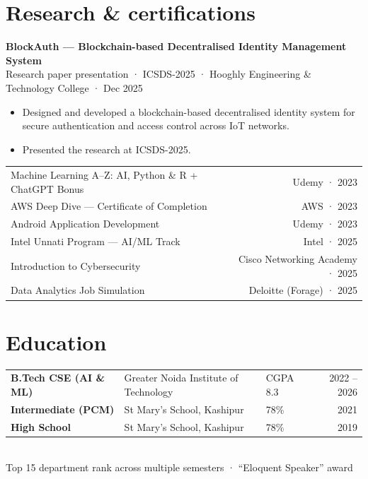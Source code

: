 \documentclass[10pt,a4paper]{article}
\begin{document}
\section{Research \& certifications}
\textbf{BlockAuth --- Blockchain-based Decentralised Identity Management System}\\
{\color{muted}\small Research paper presentation · ICSDS-2025 · Hooghly Engineering \& Technology College · Dec 2025}
\begin{itemize}
  \item Designed and developed a blockchain-based decentralised identity system for secure authentication and access control across IoT networks.
  \item Presented the research at ICSDS-2025.
\end{itemize}
\vspace{3pt}
\begin{tabularx}{\linewidth}{@{}X r@{}}
  Machine Learning A--Z: AI, Python \& R + ChatGPT Bonus & Udemy · 2023 \\
  AWS Deep Dive --- Certificate of Completion & AWS · 2023 \\
  Android Application Development & Udemy · 2023 \\
  Intel Unnati Program --- AI/ML Track & Intel · 2025 \\
  Introduction to Cybersecurity & Cisco Networking Academy · 2025 \\
  Data Analytics Job Simulation & Deloitte (Forage) · 2025 \\
\end{tabularx}

\section{Education}
\begin{tabularx}{\linewidth}{@{}>{\bfseries}l X l r@{}}
  B.Tech CSE (AI \& ML) & Greater Noida Institute of Technology & CGPA 8.3 & 2022 -- 2026 \\
  Intermediate (PCM)    & St Mary's School, Kashipur           & 78\%     & 2021 \\
  High School           & St Mary's School, Kashipur           & 78\%     & 2019 \\
\end{tabularx}\\[3pt]
{\small Top 15 department rank across multiple semesters · ``Eloquent Speaker'' award}
\end{document}

